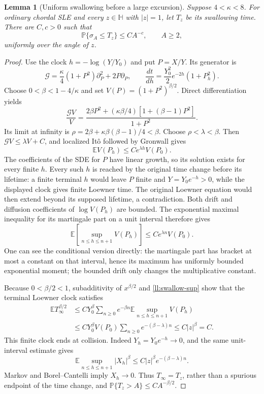 \documentclass[11pt]{article}
\newtheorem{lemma}[theorem]{Lemma}
\theoremstyle{definition}
\theoremstyle{remark}
\numberwithin{equation}{section}
\begin{document}
\begin{lemma}[Uniform swallowing before a large excursion]
\label{ll:swallowing}
Suppose $4<\kappa<8$. For ordinary chordal SLE and every
$z\in\mathbb H$ with $|z|=1$, let $T_z$ be its swallowing time.
There are $C,c>0$ such that
\[
 \mathbb P\{\sigma_A\le T_z\}\le CA^{-c},\qquad A\ge2,
\]
uniformly over the angle of $z$.
\end{lemma}

\begin{proof}
Use the clock $h=-\log(Y/Y_0)$ and put $P=X/Y$.
Its generator is
\[
 \mathcal G=\frac\kappa4(1+P^2)\partial_P^2+2P\partial_P,
 \qquad
 \frac{dt}{dh}=\frac{Y_0^2}{2}e^{-2h}(1+P_h^2).
\]
Choose $0<\beta<1-4/\kappa$ and set
$V(P)=(1+P^2)^{\beta/2}$. Direct differentiation yields
\[
 \frac{\mathcal GV}{V}
 =\frac{2\beta P^2+(\kappa\beta/4)
                          [1+(\beta-1)P^2]}{1+P^2}.
\]
Its limit at infinity is
$\rho=2\beta+\kappa\beta(\beta-1)/4<\beta$.
Choose $\rho<\lambda<\beta$. Then
$\mathcal GV\le\lambda V+C$, and localized It\^o followed by
Gronwall gives
\begin{equation}
 \mathbb EV(P_h)\le Ce^{\lambda h}V(P_0).
 \label{ll:swallow-moment}
\end{equation}
The coefficients of the SDE for $P$ have linear growth, so its
solution exists for every finite $h$. Every such $h$ is reached by
the original time change before its lifetime: a finite terminal
$h$ would leave $P$ finite and $Y=Y_0e^{-h}>0$, while the displayed
clock gives finite Loewner time. The original Loewner equation
would then extend beyond its supposed lifetime, a contradiction.
Both drift and diffusion coefficients of $\log V(P_h)$ are bounded.
The exponential maximal inequality for its martingale part on a
unit interval therefore gives
\begin{equation}
 \mathbb E\left[\sup_{n\le h\le n+1}V(P_h)\right]
       \le Ce^{\lambda n}V(P_0).
 \label{ll:swallow-sup}
\end{equation}
One can see the conditional version directly: the martingale part
has bracket at most a constant on that interval, hence its maximum
has uniformly bounded exponential moment; the bounded drift only
changes the multiplicative constant.

Because $0<\beta/2<1$, subadditivity of $x^{\beta/2}$ and
\eqref{ll:swallow-sup} show that the terminal Loewner clock satisfies
\begin{align*}
 \mathbb E T_\infty^{\beta/2}
 &\le C Y_0^\beta\sum_{n\ge0}e^{-\beta n}
          \mathbb E\sup_{n\le h\le n+1}V(P_h)\\
 &\le C Y_0^\beta V(P_0)
             \sum_{n\ge0}e^{-(\beta-\lambda)n}
 \le C|z|^\beta=C.
\end{align*}
This finite clock ends at collision. Indeed $Y_h=Y_0e^{-h}\to0$,
and the same unit-interval estimate gives
\[
 \mathbb E\sup_{n\le h\le n+1}|X_h|^\beta
        \le C|z|^\beta e^{-(\beta-\lambda)n}.
\]
Markov and Borel--Cantelli imply $X_h\to0$.
Thus $T_\infty=T_z$, rather than a spurious endpoint of the time
change, and $\mathbb P\{T_z>A\}\le CA^{-\beta/2}$.


\end{proof}
\end{document}
